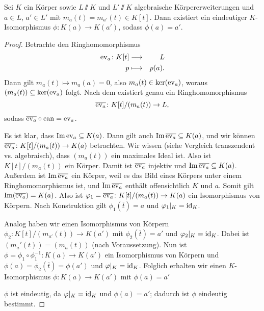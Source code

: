 \documentclass[12pt,a4paper]{scrartcl}
\begin{document}
\begin{lem}
	Sei $K$ ein Körper sowie $L\sslash K$ und $L'\sslash K$ algebraische Körpererweiterungen und $a\in L$, $a'\in L'$ mit $m_a(t)=m_{a'}(t)\in K[t]$. Dann existiert ein eindeutiger $K$-Isomorphismus $\phi\colon K(a)\to K(a')$, sodass $\phi(a) = a'$.
\end{lem}
\begin{proof}
	Betrachte den Ringhomomorphismus
	\begin{eqnarray*}
		\operatorname{ev}_a\colon K[t]&\longrightarrow& L\\
		p & \longmapsto & p(a).
	\end{eqnarray*}
	Dann gilt $m_a(t)\mapsto m_a(a) = 0$, also $m_a(t) \in \operatorname{ker}(\operatorname{ev}_a)$, woraus $(m_a(t))\subseteq \operatorname{ker}(\operatorname{ev}_a)$ folgt. Nach dem  existiert genau ein Ringhomomorphismus \[\overline{\operatorname{ev}_a}\colon K[t]/(m_a(t))\to L,\] sodass $\overline{\operatorname{ev}_a}\circ \operatorname{can} = \operatorname{ev}_a$.
	
	Es ist klar, dass $\operatorname{Im}\operatorname{ev}_a\subseteq K(a)$. Dann gilt auch $\operatorname{Im}\overline{\operatorname{ev}_a}\subseteq K(a)$, und wir können $\overline{\operatorname{ev}_a}\colon K[t]/(m_a(t))\to K(a)$ betrachten. Wir wissen (siehe Vergleich transzendent vs. algebraisch), dass $(m_a(t))$ ein maximales Ideal ist. Also ist $K[t]/(m_a(t))$ ein Körper. Damit ist $\overline{\operatorname{ev}_a}$ injektiv und $\operatorname{Im}\overline{\operatorname{ev}_a}\subseteq K(a)$. Außerdem ist $\operatorname{Im}\overline{\operatorname{ev}_a}$ ein Körper, weil es das Bild eines Körpers unter einem Ringhomomorphismus ist, und $\operatorname{Im}\overline{\operatorname{ev}_a}$ enthält offensichtlich $K$ und $a$. Somit gilt $\operatorname{Im}(\overline{\operatorname{ev}_a}) = K(a)$. Also ist $\varphi_1 = \overline{\operatorname{ev}_a}\colon K[t]/(m_a(t))\to K(a)$ ein Isomorphismus von Körpern. Nach Konstruktion gilt $\phi_1(\overline{t}) = a$ und $\varphi_1|_K = \operatorname{id}_K$.
	
	Analog haben wir einen Isomorphismus von Körpern $\phi_2: K[t]/(m_{a'}(t))\to K(a')$ mit $\phi_2(\overline{t}) =a'$ und $\varphi_2|_K  =\operatorname{id}_K$. Dabei ist $(m_a'(t)) = (m_a(t))$ (nach Voraussetzung). Nun ist $\phi = \phi_1\circ \phi_1^{-1}\colon K(a) \to K(a')$ ein Isomorphismus von Körpern und $\phi(a) = \phi_2(\overline{t}) = \phi(a')$ und $\varphi|_K = \operatorname{id}_K$. Folglich erhalten wir einen $K$-Isomorphismus $\phi\colon K(a)\to K(a')$ mit $\phi(a) = a'$
	
	$\phi$ ist eindeutig, da $\varphi|_K =\operatorname{id}_K$ und $\phi(a) =a'$; dadurch ist $\phi$ eindeutig bestimmt.
\end{proof}
\end{document}
